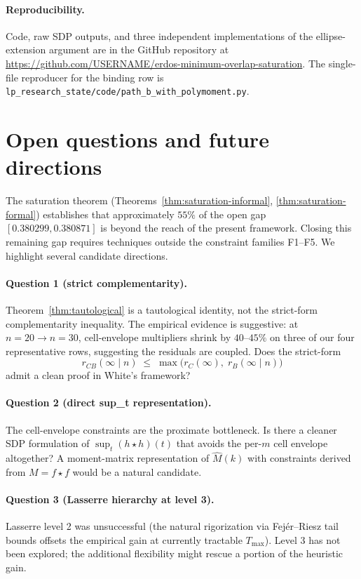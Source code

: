 \documentclass[11pt]{article}
\theoremstyle{plain}
\theoremstyle{definition}
\begin{document}
\paragraph{Reproducibility.}
Code, raw SDP outputs, and three independent implementations of the
ellipse-extension argument are in the GitHub repository at
\url{https://github.com/USERNAME/erdos-minimum-overlap-saturation}. The
single-file reproducer for the binding row is
\texttt{lp\_research\_state/code/path\_b\_with\_polymoment.py}.

\section{Open questions and future directions}\label{sec:open}

The saturation theorem (Theorems~\ref{thm:saturation-informal},
\ref{thm:saturation-formal}) establishes that approximately $55\%$ of
the open gap $[0.380299, 0.380871]$ is beyond the reach of the present
framework. Closing this remaining gap requires techniques outside the
constraint families F1--F5. We highlight several candidate directions.

\paragraph{Question 1 (strict complementarity).}
Theorem~\ref{thm:tautological} is a tautological identity, not the
strict-form complementarity inequality. The empirical evidence is
suggestive: at $n = 20 \to n = 30$, cell-envelope multipliers shrink
by $40$--$45\%$ on three of our four representative rows, suggesting
the residuals are coupled. Does the strict-form
\[
r_{CB}(\infty \mid n) \;\le\; \max\bigl(r_C(\infty),\; r_B(\infty \mid n)\bigr)
\]
admit a clean proof in White's framework?

\paragraph{Question 2 (direct sup\_t representation).}
The cell-envelope constraints are the proximate bottleneck. Is there a
cleaner SDP formulation of $\sup_t (h \star h)(t)$ that avoids the
per-$m$ cell envelope altogether? A moment-matrix representation of
$\hat M(k)$ with constraints derived from $M = f \star f$ would be a
natural candidate.

\paragraph{Question 3 (Lasserre hierarchy at level 3).}
Lasserre level 2 was unsuccessful (the natural rigorization via
Fej\'er--Riesz tail bounds offsets the empirical gain at currently
tractable $T_{\max}$). Level 3 has not been explored; the additional
flexibility might rescue a portion of the heuristic gain.
\end{document}
